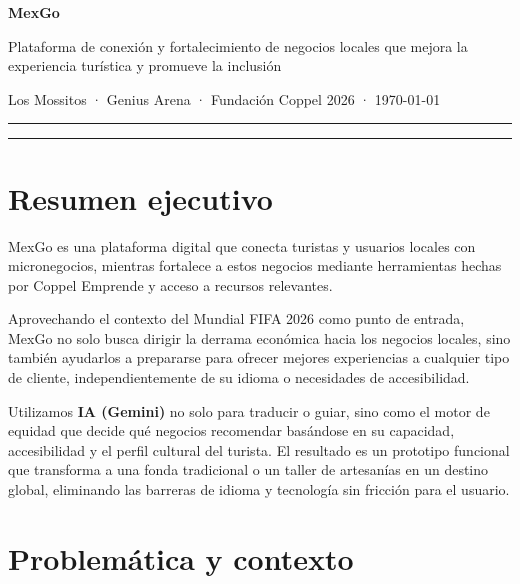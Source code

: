 \documentclass[11pt,a4paper]{article}
\begin{document}

{\centering
  {\Large\bfseries\color{primary} MexGo}\par
  \vspace{0.2cm}
  {\normalsize\color{dark} Plataforma de conexión y fortalecimiento de negocios locales que mejora la experiencia turística y promueve la inclusión}\par
  \vspace{0.2cm}
  {\small\color{gray} Los Mossitos · Genius Arena · Fundación Coppel 2026 · \today}\par
  \vspace{0.5cm}
  \hrule
  \vspace{0.8cm}
}

\tableofcontents
\vspace{0.8cm}
\hrule
\vspace{0.5cm}

\section{Resumen ejecutivo}

MexGo es una plataforma digital que conecta turistas y usuarios locales con micronegocios, mientras fortalece a estos negocios mediante herramientas hechas por Coppel Emprende y acceso a recursos relevantes.

Aprovechando el contexto del Mundial FIFA 2026 como punto de entrada, MexGo no solo busca dirigir la derrama económica hacia los negocios locales, sino también ayudarlos a prepararse para ofrecer mejores experiencias a cualquier tipo de cliente, independientemente de su idioma o necesidades de accesibilidad.

Utilizamos \textbf{IA (Gemini)} no solo para traducir o guiar, sino como el motor de equidad
que decide qué negocios recomendar basándose en su capacidad, accesibilidad y el perfil
cultural del turista. El resultado es un prototipo funcional que transforma a una fonda
tradicional o un taller de artesanías en un destino global, eliminando las barreras de
idioma y tecnología sin fricción para el usuario.

\section{Problemática y contexto}
\end{document}
